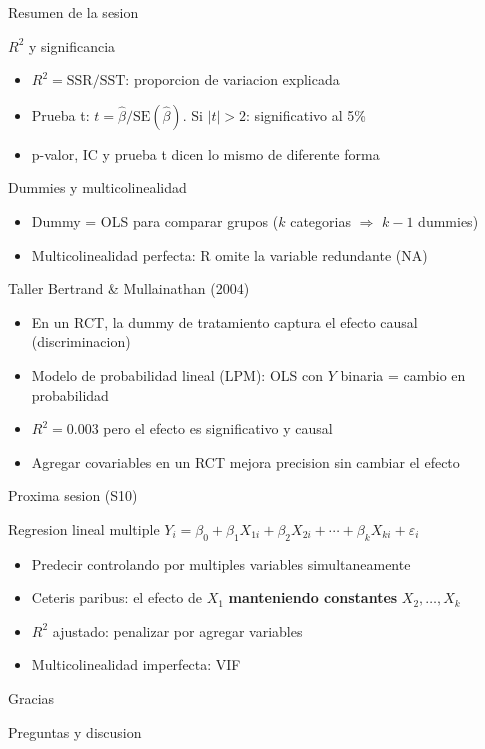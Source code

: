 \documentclass[aspectratio=169, 11pt]{beamer}
\begin{document}
\begin{frame}{Resumen de la sesion}
\footnotesize
\begin{block}{$R^2$ y significancia}
\begin{itemize}\setlength{\itemsep}{0pt}
  \item $R^2 = \text{SSR}/\text{SST}$: proporcion de variacion explicada
  \item Prueba t: $t = \hat{\beta}/\text{SE}(\hat{\beta})$. Si $|t| > 2$: significativo al 5\%
  \item p-valor, IC y prueba t dicen lo mismo de diferente forma
\end{itemize}
\end{block}

\begin{block}{Dummies y multicolinealidad}
\begin{itemize}\setlength{\itemsep}{0pt}
  \item Dummy = OLS para comparar grupos ($k$ categorias $\Rightarrow$ $k-1$ dummies)
  \item Multicolinealidad perfecta: R omite la variable redundante (NA)
\end{itemize}
\end{block}

\begin{block}{Taller Bertrand \& Mullainathan (2004)}
\begin{itemize}\setlength{\itemsep}{0pt}
  \item En un RCT, la dummy de tratamiento captura el efecto causal (discriminacion)
  \item Modelo de probabilidad lineal (LPM): OLS con $Y$ binaria = cambio en probabilidad
  \item $R^2 = 0.003$ pero el efecto es significativo y causal
  \item Agregar covariables en un RCT mejora precision sin cambiar el efecto
\end{itemize}
\end{block}
\end{frame}

\begin{frame}{Proxima sesion (S10)}
\begin{exampleblock}{Regresion lineal multiple}
$Y_i = \beta_0 + \beta_1 X_{1i} + \beta_2 X_{2i} + \cdots + \beta_k X_{ki} + \varepsilon_i$

\vspace{0.2cm}
\begin{itemize}\setlength{\itemsep}{3pt}
  \item Predecir controlando por multiples variables simultaneamente
  \item Ceteris paribus: el efecto de $X_1$ \textbf{manteniendo constantes} $X_2, \ldots, X_k$
  \item $R^2$ ajustado: penalizar por agregar variables
  \item Multicolinealidad imperfecta: VIF
\end{itemize}
\end{exampleblock}
\end{frame}

\begin{frame}
\begin{center}
\Large
Gracias

\vspace{1cm}
\normalsize
Preguntas y discusion
\end{center}
\end{frame}
\end{document}
